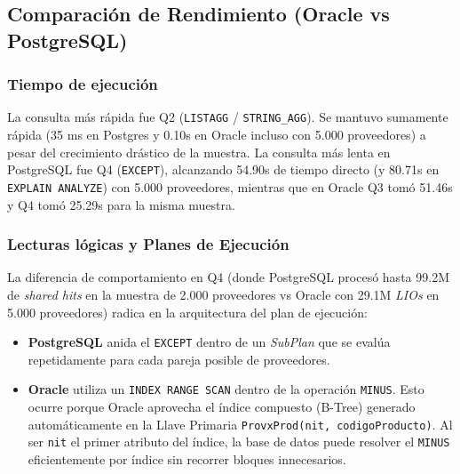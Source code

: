 \documentclass[12pt,a4paper]{article}
\begin{document}
\subsection{Comparación de Rendimiento (Oracle vs PostgreSQL)}
\subsubsection{Tiempo de ejecución}
La consulta más rápida fue Q2 (\texttt{LISTAGG} / \texttt{STRING\_AGG}). Se mantuvo sumamente rápida (35 ms en Postgres y 0.10s en Oracle incluso con 5.000 proveedores) a pesar del crecimiento drástico de la muestra.
La consulta más lenta en PostgreSQL fue Q4 (\texttt{EXCEPT}), alcanzando 54.90s de tiempo directo (y 80.71s en \texttt{EXPLAIN ANALYZE}) con 5.000 proveedores, mientras que en Oracle Q3 tomó 51.46s y Q4 tomó 25.29s para la misma muestra.

\subsubsection{Lecturas lógicas y Planes de Ejecución}
La diferencia de comportamiento en Q4 (donde PostgreSQL procesó hasta 99.2M de \textit{shared hits} en la muestra de 2.000 proveedores vs Oracle con 29.1M \textit{LIOs} en 5.000 proveedores) radica en la arquitectura del plan de ejecución:
\begin{itemize}
    \item \textbf{PostgreSQL} anida el \texttt{EXCEPT} dentro de un \textit{SubPlan} que se evalúa repetidamente para cada pareja posible de proveedores.
    \item \textbf{Oracle} utiliza un \texttt{INDEX RANGE SCAN} dentro de la operación \texttt{MINUS}. Esto ocurre porque Oracle aprovecha el índice compuesto (B-Tree) generado automáticamente en la Llave Primaria \texttt{ProvxProd(nit, codigoProducto)}. Al ser \texttt{nit} el primer atributo del índice, la base de datos puede resolver el \texttt{MINUS} eficientemente por índice sin recorrer bloques innecesarios.
\end{itemize}
\end{document}
